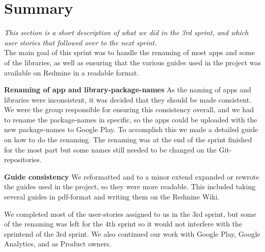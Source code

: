 \section{Summary} 
\textit{This section is a short description of what we did in the 3rd sprint, and which user stories that followed over to the next sprint.}\\

The main goal of this sprint was to handle the renaming of most apps and some of the libraries, as well as ensuring that the various guides used in the project was available on Redmine in a readable format.


\textbf{Renaming of app and library-package-names}
As the naming of apps and libraries were inconsistent, it was decided that they should be made consistent. We were the group responsible for ensuring this consistency overall, and we had to rename the package-names in specific, so the apps could be uploaded with the new package-names to Google Play. To accomplish this we made a detailed guide on how to do the renaming. The renaming was at the end of the sprint finished for the most part but some names still needed to be changed on the Git-repositories.

\textbf{Guide consistency}
We reformatted and to a minor extend expanded or rewrote the guides used in the project, so they were more readable. This included taking several guides in pdf-format and writing them on the Redmine Wiki.

We completed most of the user-stories assigned to us in the 3rd sprint, but some of the renaming was left for the 4th sprint so it would not interfere with the sprintend of the 3rd sprint. We also continued our work with Google Play, Google Analytics, and as Product owners.